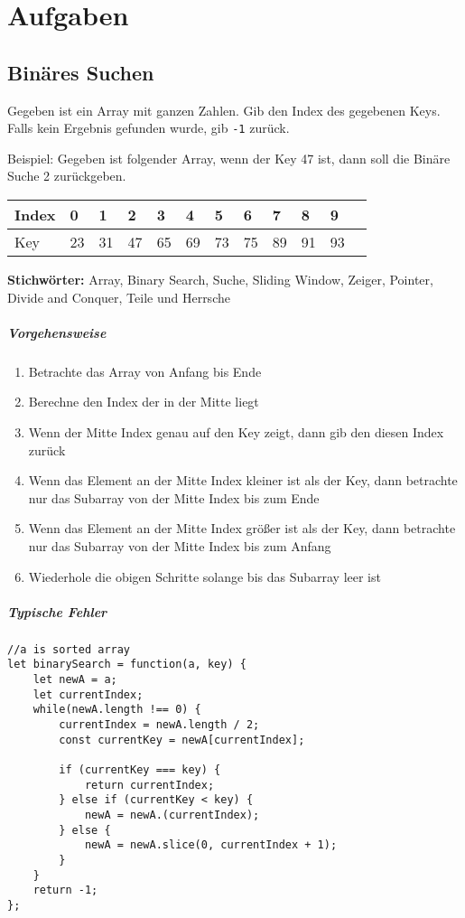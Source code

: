 \documentclass{book}
\begin{document}
\chapter{Aufgaben}
\section{Binäres Suchen}
\begin{examplei}
Gegeben ist ein Array mit ganzen Zahlen. Gib den Index des gegebenen Keys. Falls kein Ergebnis gefunden wurde, gib \lstinline|-1| zurück.

Beispiel:
Gegeben ist folgender Array, wenn der Key 47 ist, dann soll die Binäre Suche 2 zurückgeben.


	\begin{tabular}{|l|l|l|l|l|l|l|l|l|l|l|l|} 
		\hline
		Index     & 0 & 1 & 2 & 3 & 4 & 5  & 6  & 7  & 8  & 9 \\ 
		\hline
		Key & 23 & 31 & 47	  & 65 & 69 & 73 & 75 & 89 & 91 & 93 \\
		\hline
	\end{tabular}

\end{examplei}
{\bf Stichwörter:} Array, Binary Search, Suche, Sliding Window, Zeiger, Pointer, Divide and Conquer, Teile und Herrsche
\paragraph{Vorgehensweise}
\begin{enumerate} 
	\item Betrachte das Array von Anfang bis Ende
	\item Berechne den Index der in der Mitte liegt
	\item Wenn der Mitte Index genau auf den Key zeigt, dann gib den diesen Index zurück
	\item Wenn das Element an der Mitte Index kleiner ist als der Key, dann betrachte nur das Subarray von der Mitte Index bis zum Ende
	\item Wenn das Element an der Mitte Index größer ist als der Key, dann betrachte nur das Subarray von der Mitte Index bis zum Anfang
	\item Wiederhole die obigen Schritte solange bis das Subarray leer ist
\end{enumerate}

\paragraph{Typische Fehler}
\begin{lstlisting}[caption=My Javascript Example]
//a is sorted array
let binarySearch = function(a, key) {
	let newA = a;
	let currentIndex;
	while(newA.length !== 0) {
		currentIndex = newA.length / 2;
		const currentKey = newA[currentIndex];
	
		if (currentKey === key) {
			return currentIndex;
		} else if (currentKey < key) {
			newA = newA.(currentIndex);
		} else {
			newA = newA.slice(0, currentIndex + 1);
		}
	}
	return -1;
};
\end{lstlisting}
\end{document}
